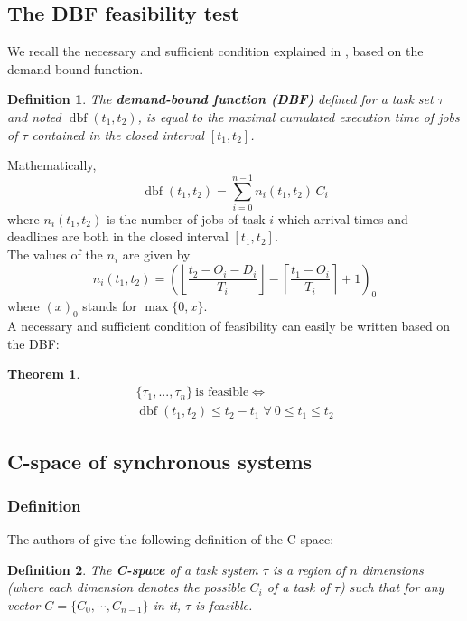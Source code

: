 \documentclass[conference]{IEEEtran}
\newtheorem{theorem}{Theorem}
\newtheorem{definition}{Definition}
\newcommand{\dbf}[1]{\operatorname{dbf}(#1)}
\begin{document}
  \subsection{The DBF feasibility test}

  We recall the necessary and sufficient condition explained in \cite{baruah1999generalized, baruah1990algorithms}, based on the demand-bound function.

  \begin{definition}
    The \textbf{demand-bound function (DBF)}
    defined for a task set $\tau$ and noted $\dbf{t_1, t_2}$, is equal to
    the maximal cumulated execution time of jobs of $\tau$ contained in the
    closed interval $[t_1, t_2]$.
  \end{definition}

  Mathematically,
  \[
    \dbf{t_1, t_2} = \sum_{i=0}^{n-1} n_i(t_1, t_2) \, C_i
  \]
  where $n_i(t_1, t_2)$ is the number of jobs of task $i$ which arrival times
  and deadlines are both in the closed interval $[t_1, t_2]$.\\

  The values of the $n_i$ are given by
  \[
    n_i(t_1, t_2) =
    \left(
      \left\lfloor
        \frac{t_2 - O_i - D_i}{T_i}
      \right\rfloor -
      \left\lceil
        \frac{t_1 - O_i}{T_i}
      \right\rceil + 1
    \right)_0
  \]
  where $( x )_0$ stands for $\max \{ 0, x \}$.\\

  A necessary and sufficient condition of feasibility can easily be written
  based on the DBF:

  \begin{theorem}
  \[
    \begin{array}{c}
      \{\tau_1, ..., \tau_n\} \: \text{is feasible}  \iff \\
      \dbf{t_1, t_2} \leq t_2 - t_1 \; \forall \: 0 \leq t_1 \leq t_2
    \end{array}
  \]
  \end{theorem}

  \subsection{C-space of synchronous systems}

    \subsubsection{Definition}

      The authors of \cite{george2009characterization} give the following definition of the C-space:
      \begin{definition}
        The \textbf{C-space} of a task system $\tau$ is a region of $n$ dimensions (where each dimension denotes the possible $C_i$ of a task of $\tau$) such that for any vector $C = \{ C_0, \cdots, C_{n-1}\}$ in it, $\tau$ is feasible.
      \end{definition}
\end{document}

